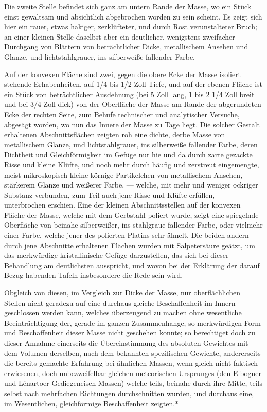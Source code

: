 \documentclass[a4paper, 11pt, oneside, german]{article}
\begin{document}
Die zweite Stelle befindet sich ganz am untern Rande der Masse, wo ein Stück einst gewaltsam und absichtlich abgebrochen worden zu sein scheint. Es zeigt sich hier ein rauer, etwas hakiger, zerklüfteter, und durch Rost verunstalteter Bruch; an einer kleinen Stelle daselbst aber ein deutlicher, wenigstens zweifacher Durchgang von Blättern von beträchtlicher Dicke, metallischem Ansehen und Glanze, und lichtstahlgrauer, ins silberweiße fallender Farbe.

Auf der konvexen Fläche sind zwei, gegen die obere Ecke der Masse isoliert stehende Erhabenheiten, auf 1/4 bis 1/2 Zoll Tiefe, und auf der ebenen Fläche ist ein Stück von beträchtlicher Ausdehnung (bei 5 Zoll lang, 1 bis 2 1/4 Zoll breit und bei 3/4 Zoll dick) von der Oberfläche der Masse am Rande der abgerundeten Ecke der rechten Seite, zum Behufe technischer und analytischer Versuche, abgesägt worden, wo nun das Innere der Masse zu Tage liegt. Die solcher Gestalt erhaltenen Abschnittsflächen zeigten roh eine dichte, derbe Masse von metallischem Glanze, und lichtstahlgrauer, ins silberweiße fallender Farbe, deren Dichtheit und Gleichförmigkeit im Gefüge nur hie und da durch zarte gezackte Risse und kleine Klüfte, und noch mehr durch häufig und zerstreut eingemengte, meist mikroskopisch kleine körnige Partikelchen von metallischem Ansehen, stärkerem Glanze und weißerer Farbe, --- welche, mit mehr und weniger ockriger Substanz verbunden, zum Teil auch jene Risse und Klüfte erfüllen, --- unterbrochen erschien. Eine der kleinen Abschnittsstellen auf der konvexen Fläche der Masse, welche mit dem Gerbstahl poliert wurde, zeigt eine spiegelnde Oberfläche von beinahe silberweißer, ins stahlgraue fallender Farbe, oder vielmehr einer Farbe, welche jener des polierten Platins sehr ähnelt. Die beiden andern durch jene Abschnitte erhaltenen Flächen wurden mit Salpetersäure geätzt, um das merkwürdige kristallinische Gefüge darzustellen, das sich bei dieser Behandlung am deutlichsten ausspricht, und wovon bei der Erklärung der darauf Bezug habenden Tafeln insbesondere die Rede sein wird.

Obgleich von diesen, im Vergleich zur Dicke der Masse, nur oberflächlichen Stellen nicht geradezu auf eine durchaus gleiche Beschaffenheit im Innern geschlossen werden kann, welches überzeugend zu machen ohne wesentliche Beeinträchtigung der, gerade im ganzen Zusammenhange, so merkwürdigen Form und Beschaffenheit dieser Masse nicht geschehen konnte; so berechtiget doch zu dieser Annahme einerseits die Übereinstimmung des absoluten Gewichtes mit dem Volumen derselben, nach dem bekannten spezifischen Gewichte, andererseits die bereits gemachte Erfahrung bei ähnlichen Massen, wenn gleich nicht faktisch erwiesenen, doch unbezweifelbar gleichen meteorischen Ursprunges (den Elbogner und Lénartoer Gediegeneisen-Massen) welche teils, beinahe durch ihre Mitte, teils selbst nach mehrfachen Richtungen durchschnitten wurden, und durchaus eine, im Wesentlichen, gleichförmige Beschaffenheit zeigten.*
\end{document}

